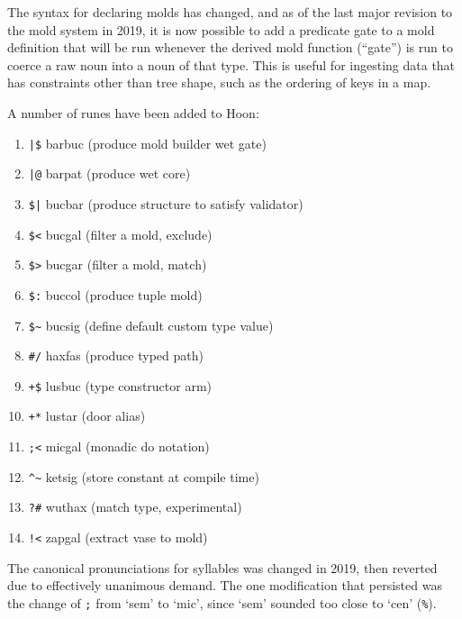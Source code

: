 \documentclass[twoside]{article}
\begin{document}
The syntax for declaring molds has changed, and as of the last major revision to the mold system in 2019, it is now possible to add a predicate gate to a mold definition that will be run whenever the derived mold function (``gate'') is run to coerce a raw noun into a noun of that type.  This is useful for ingesting data that has constraints other than tree shape, such as the ordering of keys in a map.

A number of runes have been added to Hoon:

\begin{enumerate}
  \item  \lstinline[style=inlinecode]{|$} barbuc (produce mold builder wet gate)
  \item  \lstinline[style=inlinecode]{|@} barpat (produce wet core)
  \item  \lstinline[style=inlinecode]{$|} bucbar (produce structure to satisfy validator)
  \item  \lstinline[style=inlinecode]{$<} bucgal (filter a mold, exclude)
  \item  \lstinline[style=inlinecode]{$>} bucgar (filter a mold, match)
  \item  \lstinline[style=inlinecode]{$:} buccol (produce tuple mold)
  \item  \lstinline[style=inlinecode]{$~} bucsig (define default custom type value)
  \item  \lstinline[style=inlinecode]{#/} haxfas (produce typed path)
  \item  \lstinline[style=inlinecode]{+$} lusbuc (type constructor arm)
  \item  \lstinline[style=inlinecode]{+*} lustar (door alias)
  \item  \lstinline[style=inlinecode]{;<} micgal (monadic do notation)
  \item  \lstinline[style=inlinecode]{^~} ketsig (store constant at compile time)
  \item  \lstinline[style=inlinecode]{?#} wuthax (match type, experimental)
  \item  \lstinline[style=inlinecode]{!<} zapgal (extract vase to mold)
\end{enumerate}

The canonical pronunciations for syllables was changed in 2019, then reverted due to effectively unanimous demand.  The one modification that persisted was the change of \lstinline[style=inlinecode]{;} from `sem' to `mic', since `sem' sounded too close to `cen' (\lstinline[style=inlinecode]{%}).
\end{document}
